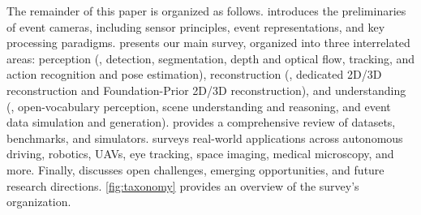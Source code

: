 The remainder of this paper is organized as follows.  introduces the preliminaries of event cameras, including sensor principles, event representations, and key processing paradigms.  presents our main survey, organized into three interrelated areas: perception (\ie, detection, segmentation, depth and optical flow, tracking, and action recognition and pose estimation), reconstruction (\ie, dedicated 2D/3D reconstruction and Foundation-Prior 2D/3D reconstruction), and understanding (\ie, open-vocabulary perception, scene understanding and reasoning, and event data simulation and generation).  provides a comprehensive review of datasets, benchmarks, and simulators.  surveys real-world applications across autonomous driving, robotics, UAVs, eye tracking, space imaging, medical microscopy, and more. Finally,  discusses open challenges, emerging opportunities, and future research directions. \cref{fig:taxonomy} provides an overview of the survey's organization.

